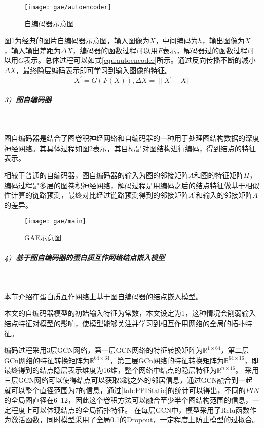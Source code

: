 \begin{figure}[htbp]
    \centering
    \texttt{[image: gae/autoencoder]}
    \caption{自编码器示意图}
    \label{fig:gae/autoencoder}
\end{figure}

图\ref{fig:gae/autoencoder}为经典的图片自编码器示意图，输入图像为$X$，中间编码为$h$，输出图像为$X^\prime $，输入输出差距为$\varDelta X$，编码器的函数过程可以用$F$表示，解码器过的函数过程可以用$G$表示。总体过程可以如式\ref{equ:autoencoder}所示。通过反向传播不断的减小$\varDelta X$，最终隐层编码表示即可学习到输入图像的特征。
\begin{equation}
    \label{equ:autoencoder}
    X^\prime =G(F(X)),
    \varDelta X={\| X^\prime - X \Vert}
\end{equation}

\subparagraph{3)~图自编码器} ~

图自编码器是结合了图卷积神经网络和自编码器的一种用于处理图结构数据的深度神经网络。其具体过程如图\ref{fig:gae/main}表示，其目标是对图结构进行编码，得到结点的特征表示。

相较于普通的自编码器，图自编码器的输入为图的邻接矩阵$A$和图的特征矩阵$H$，编码过程是多层的图卷积神经网络，解码过程是用编码之后的结点特征做基于相似性计算的链路预测，最终对比经过链路预测得到的邻接矩阵$A^{\prime}$和输入的邻接矩阵$A$的差异。

\begin{figure}[htbp]
    \centering
    \texttt{[image: gae/main]}
    \caption{GAE示意图\cite{wu_comprehensive_2020}}
    \label{fig:gae/main}
\end{figure}


\subparagraph{4)~基于图自编码器的蛋白质互作网络结点嵌入模型} ~

本节介绍在蛋白质互作网络上基于图自编码器的结点嵌入模型。

本文的自编码器模型的初始输入特征为常数，本文设定为1，这种情况会削弱输入结点特征对模型的影响，使模型能够关注并学习到相互作用网络的全局的拓扑特征。

编码过程采用3层GCN网络，第一层GCN网络的特征转换矩阵为$\mathbb{R} ^{1\times 64}$，第二层GCn网络的特征转换矩阵为$\mathbb{R} ^{64\times 64}$，第三层GCn网络的特征转换矩阵为$\mathbb{R} ^{64\times 16}$，即最终得到的结点隐层表示维度为16维，整个网络中结点的隐层特征为$\mathbb{R} ^{n\times 16}$。
采用三层GCN网络可以使得结点可以获取3跳之外的邻居信息，通过GCN融合到一起就可以整个直径范围为7的信息，通过\ref{tab:PPIStatic}的统计可以得出，不同的$PIN$的全局图直径在6~12，因此这个卷积方法可以融合至少半个图结构范围的信息，一定程度上可以体现结点的全局拓扑特征。
在每层GCN中，模型采用了Relu函数作为激活函数，同时模型采用了全局0.1的Dropout，一定程度上防止模型的过拟合。

